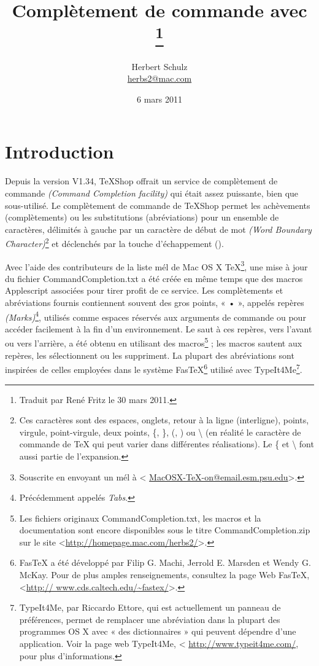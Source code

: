 \documentclass[12pt,french]{article}
\title{\sffamily\bfseries Complètement de commande avec\\ \texs\space\thanks{Traduit par René Fritz le 30 mars 2011.}}
\author{Herbert Schulz\\\small\href{mailto:herbs2@mac.com}{herbs2@mac.com}}
\date{6 mars 2011}
\newcommand{\esc}{{\WD \symbol{82}}}
\newcommand{\texs}{\textsf{\TeX{}Shop}}
\newcommand{\tex}{\textsf{\TeX}}
\begin{document}
\maketitle

\section*{Introduction}

Depuis la version V1.34, \texs{} offrait un service de complètement de commande \emph{(Command Completion 
facility)} qui était assez puissante, bien que sous-utilisé. Le complètement de commande de \texs{} permet les achèvements (complètements) ou les substitutions (abréviations) pour un ensemble de caractères, délimités à gauche par un caractère de début de mot \emph{(Word Boundary Character)}\footnote{Ces caractères sont des espaces, onglets, retour à la ligne (interligne), points, virgule, point-virgule, deux points, \{, \}, (, ) ou \textbackslash{} (en réalité le caractère de commande de \tex{} qui peut varier dans différentes réalisations). Le \{{} et \textbackslash{} font aussi partie de l'expansion.} et déclenchés par la touche d'échappement (\esc).

Avec l'aide des contributeurs de la liste mél de \textsf{Mac OS X} \tex{}\footnote{Souscrite en envoyant un mél à <
\href{mailto:MacOSX-TeX-on@email.esm.psu.edu}{MacOSX-TeX-on@email.esm.psu.edu}>.}, une mise à jour du 
fichier \textsf{CommandCompletion.txt} a été créée en même temps que des macros Applescript associées pour tirer 
profit de ce service. Les complètements et abréviations fournis contiennent souvent des gros points, « • », appelés 
repères \emph{(Marks)}\footnote{Précédemment appelés \emph{Tabs}.}, utilisés comme espaces réservés aux 
arguments de commande ou pour accéder facilement à la fin d'un environnement. Le saut à ces repères, vers l'avant 
ou vers l'arrière, a été obtenu en utilisant des macros\footnote{Les fichiers originaux 
\textsf{CommandCompletion.txt}, les macros et la documentation sont encore disponibles sous le titre 
\textsf{CommandCompletion.zip} sur le site <\url{http://homepage.mac.com/herbs2/}>.} ; les macros sautent aux 
repères, les sélectionnent ou les suppriment. La plupart des abréviations sont inspirées de celles employées dans le 
système \textsf{Fas\tex}\footnote{\textsf{Fas\tex} a été développé par Filip G. Machi, Jerrold E. Marsden et Wendy G. 
McKay. Pour de plus amples renseignements, consultez la page Web \textsf{Fas\tex}, <\url{http://
www.cds.caltech.edu/~fastex/}>.} utilisé avec \textsf{TypeIt4Me}\footnote{\textsf{TypeIt4Me}, par Riccardo Ettore, qui 
est actuellement un panneau de préférences, permet de remplacer une abréviation dans la plupart des programmes 
OS X avec « des dictionnaires » qui peuvent dépendre d'une application. Voir la page web \textsf{TypeIt4Me}, <
\url{http://www.typeit4me.com/}, pour plus d'informations.}.
\enlargethispage*{\baselineskip}
\end{document}
